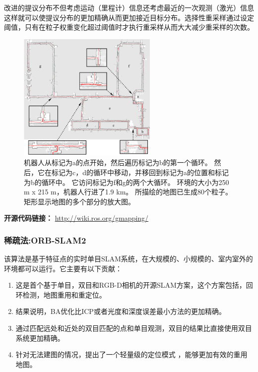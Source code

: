 \documentclass[cs4size,a4paper]{ctexart}
\numberwithin{equation}{section}
\numberwithin{table}{section}
\numberwithin{figure}{section}
\begin{document}
改进的提议分布不但考虑运动（里程计）信息还考虑最近的一次观测（激光）信息这样就可以使提议分布的更加精确从而更加接近目标分布。选择性重采样通过设定阈值，只有在粒子权重变化超过阈值时才执行重采样从而大大减少重采样的次数。

\begin{figure}[H]
  \centering
  \includegraphics[width=0.6\textwidth]{figure/gmapping-1.png}
  \caption{机器人从标记为a的点开始，然后遍历标记为b的第一个循环。 然后，它在标记为c，d的循环中移动，并移回到标记为a的位置和标记为b的循环中。 它访问标记为f和g的两个大循环。 环境的大小为250 m x 215 m，机器人行进了1.9 km。 所描绘的地图已生成80个粒子。 矩形显示地图的多个部分的放大图。}
\end{figure}

\textbf{开源代码链接：}
\url{http://wiki.ros.org/gmapping/}

\subsubsection{稀疏法:ORB-SLAM2}
该算法\cite{murORB2}是基于特征点的实时单目SLAM系统，在大规模的、小规模的、室内室外的环境都可以运行。它主要有以下贡献：
\begin{enumerate}[1)]
        \item 这是首个基于单目，双目和RGB-D相机的开源SLAM方案，这个方案包括，回环检测，地图重用和重定位。
        \item 结果说明，BA优化比ICP或者光度和深度误差最小方法的更加精确。
        \item 通过匹配远处和近处的双目匹配的点和单目观测，双目的结果比直接使用双目系统更加精确。
        \item 针对无法建图的情况，提出了一个轻量级的定位模式 ，能够更加有效的重用地图。
\end{enumerate}
\end{document}
